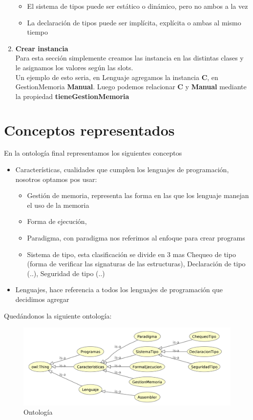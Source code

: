 \documentclass[12pt, titlepage, a4paper]{article}
\begin{document}
\begin{enumerate}
{\begin{itemize}
{                ambos a la vez}
            \item {El sistema de tipos puede ser estático o dinámico, pero no
                ambos a la vez}
            \item {La declaración de tipos puede ser implícita, explícita o ambas al mismo tiempo}
          \end{itemize}
          }
    \item {\textbf{Crear instancia}\\
         Para esta sección simplemente creamos las instancia en las 
         distintas clases y le asignamos los valores según las slots.\\ 
         Un ejemplo de esto seria, en Lenguaje agregamos la 
         instancia \textbf{C}, en GestionMemoria \textbf{Manual}. 
         Luego podemos relacionar \textbf{C} y \textbf{Manual} mediante la 
         propiedad \textbf{tieneGestionMemoria}}
\end{enumerate}

\section{Conceptos representados}
En la ontología final representamos los siguientes conceptos
\begin{itemize}
    \item {Características, cualidades que cumplen los lenguajes de programación, 
        nosotros optamos pos usar:
        \begin{itemize}
            \item {Gestión de memoria, representa las forma en las que los 
                lenguaje manejan el uso de la memoria}
            \item {Forma de ejecución, }
            \item {Paradigma, con paradigma nos referimos al
                enfoque para crear programs}
            \item {Sistema de tipo, esta clasificación se divide en 3 mas
                Chequeo de tipo (forma de verificar las signaturas de las 
                estructuras), Declaración de tipo (..), Seguridad de tipo 
                (..)}
        \end{itemize}}
    \item {Lenguajes, hace referencia a todos los lenguajes de programación 
        que decidimos agregar}
\end{itemize}

\noindent Quedándonos la siguiente ontología:
\begin{figure}[H]
    \centering
    \includegraphics[width=.8\textwidth]{Imagenes/Ontologia.png}
    \caption{Ontología}
\end{figure}
\end{document}
